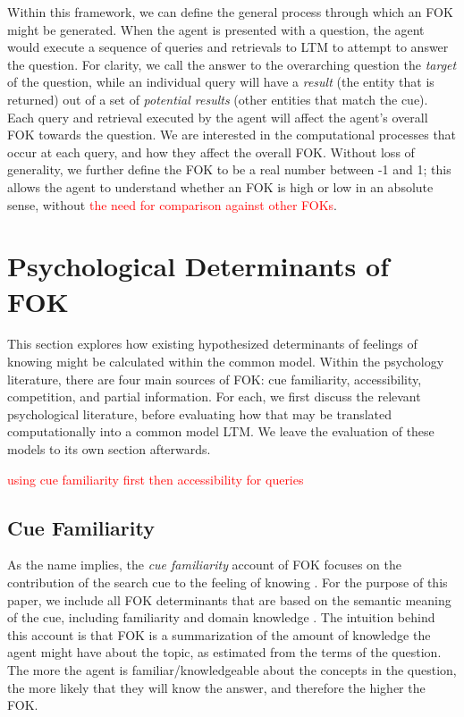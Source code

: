 \documentclass[10pt,letterpaper]{article}
\newcommand{\fixme}[2][]{#2}
\renewcommand{\fixme}[2][]{\textcolor{red}{#2}}
\begin{document}
Within this framework, we can define the general process through which an FOK might be generated.
When the agent is presented with a question, the agent would execute a sequence of queries and retrievals to LTM to attempt to answer the question.
For clarity, we call the answer to the overarching question the \emph{target} of the question, while an individual query will have a \emph{result} (the entity that is returned) out of a set of \emph{potential results} (other entities that match the cue).
Each query and retrieval executed by the agent will affect the agent's overall FOK towards the question.
We are interested in the computational processes that occur at each query, and how they affect the overall FOK.
Without loss of generality, we further define the FOK to be a real number between -1 and 1; this allows the agent to understand whether an FOK is high or low in an absolute sense, without \fixme[I'm not sure how that would work]{the need for comparison against other FOKs}.


\section{Psychological Determinants of FOK}

This section explores how existing hypothesized determinants of feelings of knowing might be calculated within the common model.
Within the psychology literature, there are four main sources of FOK: cue familiarity, accessibility, competition, and partial information.
For each, we first discuss the relevant psychological literature, before evaluating how that may be translated computationally into a common model LTM.
We leave the evaluation of these models to its own section afterwards.

\fixme{using cue familiarity first then accessibility for queries}

\subsection{Cue Familiarity}

As the name implies, the \emph{cue familiarity} account of FOK focuses on the contribution of the search cue to the feeling of knowing \cite{Reder1992WhatDeterminesInitial,Metcalfe1993TheCueFamiliarity,Koriat2001TheCombinedContributions}.
For the purpose of this paper, we include all FOK determinants that are based on the semantic meaning of the cue, including familiarity and domain knowledge \cite{Schwartz1994SourcesOfInformation}.
The intuition behind this account is that FOK is a summarization of the amount of knowledge the agent might have about the topic, as estimated from the terms of the question.
The more the agent is familiar/knowledgeable about the concepts in the question, the more likely that they will know the answer, and therefore the higher the FOK.
\end{document}
